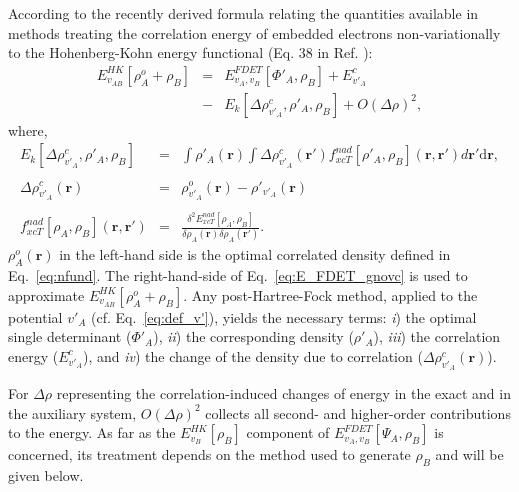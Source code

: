 \documentclass[amsmath,amssymb,preprint,aip,jcp]{revtex4-1}
\begin{document}
According to the recently derived formula relating the quantities available in methods treating the correlation energy of embedded electrons non-variationally to the Hohenberg-Kohn energy functional (Eq. 38 in Ref. ): 
\begin{eqnarray} \label{eq:E_FDET_gnovc}
 E_{v_{AB}}^{HK}[\rho_A^{o}+\rho_B] &=& E_{v_{A},{v_B}}^{FDET}[\Phi'_{A},\rho_B] + E^{c}_{v'_A} 
 \\ \nonumber
 &-& E_k[\Delta \rho^{c}_{v'_A}, \rho'_A, \rho_B] + O(\Delta\rho)^2, 
 \end{eqnarray}
where,
\begin{eqnarray}
\label{eq:nkernel}
 E_k[\Delta \rho^{c}_{v'_A}, \rho'_A, \rho_B] &=&
 \int \rho'_A(\mathbf{r}) \int \Delta \rho^{c}_{v'_A}(\mathbf{r'}) f^{nad}_{xcT}[\rho'_A, \rho_B](\mathbf{r},\mathbf{r'})d\mathbf{r'}\mathrm{d}\mathbf{r},\\
 \nonumber \\ \label{eq:def_corrdens}
 \Delta \rho^{c}_{v'_A}(\mathbf{r})&=&\rho^{o}_{v'_A}(\mathbf{r})-\rho'_{v'_A}(\mathbf{r})\\
 \nonumber \\
 \label{eq:nf_nad}
 f^{nad}_{xcT}[\rho_A, \rho_B](\mathbf{r},\mathbf{r'}) &=& \frac{\delta^2 E^{nad}_{xcT}[\rho_A, \rho_B]}{\delta \rho_A(\mathbf{r}) \delta \rho_A(\mathbf{r'})}.
\end{eqnarray}
$\rho_A^{o}(\mathbf{r})$ in the left-hand side is the optimal correlated density defined in Eq.~\ref{eq:nfund}. 
The right-hand-side of Eq.~\ref{eq:E_FDET_gnovc} is used to approximate $E_{v_{AB}}^{HK}[\rho_A^{o}+\rho_B]$.
Any post-Hartree-Fock method, applied to the potential $v'_A$ (cf. Eq.~\ref{eq:def_v'}), yields the necessary terms: {\it i})
the optimal single determinant ($\Phi'_{A}$), {\it ii}) the corresponding density ($\rho'_{A}$), 
{\it iii}) the correlation energy ($E^{c}_{v'_A}$), and {\it iv}) the change of the density due to correlation ($\Delta \rho^{c}_{v'_A}(\mathbf{r})$). 

For $\Delta\rho$ representing the correlation-induced changes of energy in the exact and in the auxiliary system, 
 $O(\Delta\rho)^2$ collects all second- and higher-order contributions to the energy. 
As far as the $E^{HK}_{v_B}[\rho_B]$ component of ${ E}_{v_A,v_B}^{FDET}[\Psi_{A},\rho_B]$ is concerned,
its treatment depends on the method used to generate $\rho_B$ and will be given below.
\end{document}
